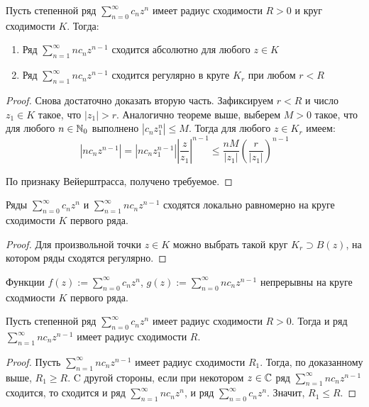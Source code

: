 \begin{proposition}
	Пусть степенной ряд $\sum_{n=0}^\infty c_nz^n$ имеет радиус сходимости $R > 0$ и круг сходимости $K$. Тогда:
	\begin{enumerate}
		\item Ряд $\sum_{n = 1}^\infty nc_nz^{n-1}$ сходится абсолютно для любого $z \in K$
		\item Ряд $\sum_{n = 1}^\infty nc_nz^{n-1}$ сходится регулярно в круге $K_r$ при любом $r < R$
	\end{enumerate}
\end{proposition}

\begin{proof}
	Снова достаточно доказать вторую часть. Зафиксируем $r < R$ и число $z_1 \in K$ такое, что $|z_1| > r$. Аналогично теореме выше, выберем $M > 0$ такое, что для любого $n \in \mathbb{N}_0$ выполнено $|c_nz_1^n| \le M$. Тогда для любого $z \in K_r$ имеем:
	\[\left|nc_nz^{n-1}\right| = \left|nc_nz_1^{n-1}\right|\left|\frac{z}{z_1}\right|^{n-1} \le \frac{nM}{|z_1|}\left(\frac{r}{|z_1|}\right)^{n-1}\]
	
	По признаку Вейерштрасса, получено требуемое.
\end{proof}

\begin{corollary}
	Ряды $\sum_{n=0}^\infty c_nz^n$ и $\sum_{n = 1}^\infty nc_nz^{n-1}$ сходятся локально равномерно на круге сходимости $K$ первого ряда.
\end{corollary}

\begin{proof}
	Для произвольной точки $z \in K$ можно выбрать такой круг $K_r \supset B(z)$, на котором ряды сходятся регулярно.
\end{proof}

\begin{corollary}
	Функции $f(z) := \sum_{n = 0}^\infty c_nz^n$, $g(z) := \sum_{n = 0}^\infty nc_nz^{n-1}$ непрерывны на круге сходмиости $K$ первого ряда.
\end{corollary}

\begin{corollary}
	Пусть степенной ряд $\sum_{n=0}^\infty c_nz^n$ имеет радиус сходимости $R > 0$. Тогда и ряд $\sum_{n = 1}^\infty nc_nz^{n-1}$ имеет радиус сходимости $R$.
\end{corollary}

\begin{proof}
	Пусть $\sum_{n = 1}^\infty nc_nz^{n-1}$ имеет радиус сходимости $R_1$. Тогда, по доказанному выше, $R_1 \ge R$. C другой стороны, если при некотором $z \in \mathbb{C}$ ряд $\sum_{n = 1}^\infty nc_nz^{n-1}$ сходится, то сходится и ряд $\sum_{n = 1}^\infty nc_nz^n$, и ряд $\sum_{n = 0}^\infty c_nz^n$. Значит, $R_1 \le R$.
\end{proof}

